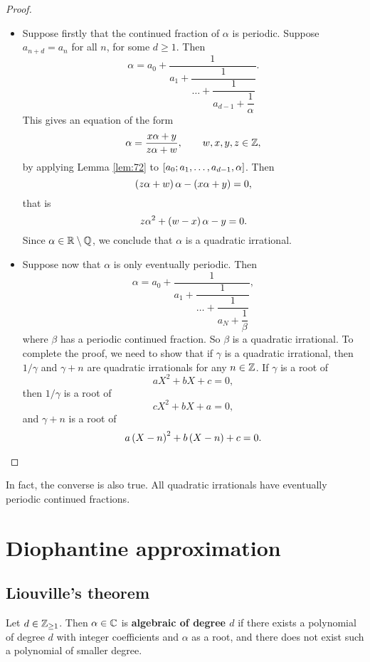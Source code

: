 \begin{proof}
\hfill
\begin{itemize}
\item Suppose firstly that the continued fraction of $ \alpha $ is periodic. Suppose $ a_{n + d} = a_n $ for all $ n $, for some $ d \ge 1 $. Then
$$ \alpha = a_0 + \dfrac{1}{a_1 + \dfrac{1}{\dots + \dfrac{1}{a_{d - 1} + \dfrac{1}{\alpha}}}}. $$
This gives an equation of the form
$$ \alpha = \dfrac{x\alpha + y}{z\alpha + w}, \qquad w, x, y, z \in \mathbb{Z}, $$
by applying Lemma \ref{lem:72} to $ \sbr{a_0; a_1, \dots, a_{d - 1}, \alpha} $. Then
$$ \br{z\alpha + w}\alpha - \br{x\alpha + y} = 0, $$
that is
$$ z\alpha^2 + \br{w - x}\alpha - y = 0. $$
Since $ \alpha \in \mathbb{R} \setminus \mathbb{Q} $, we conclude that $ \alpha $ is a quadratic irrational.
\item Suppose now that $ \alpha $ is only eventually periodic. Then
$$ \alpha = a_0 + \dfrac{1}{a_1 + \dfrac{1}{\dots + \dfrac{1}{a_N + \dfrac{1}{\beta}}}}, $$
where $ \beta $ has a periodic continued fraction. So $ \beta $ is a quadratic irrational. To complete the proof, we need to show that if $ \gamma $ is a quadratic irrational, then $ 1 / \gamma $ and $ \gamma + n $ are quadratic irrationals for any $ n \in \mathbb{Z} $. If $ \gamma $ is a root of
$$ aX^2 + bX + c = 0, $$
then $ 1 / \gamma $ is a root of
$$ cX^2 + bX + a = 0, $$
and $ \gamma + n $ is a root of
$$ a\br{X - n}^2 + b\br{X - n} + c = 0. $$
\end{itemize}
\end{proof}

In fact, the converse is also true. All quadratic irrationals have eventually periodic continued fractions.

\pagebreak

\section{Diophantine approximation}

\subsection{Liouville's theorem}

\begin{definition}
Let $ d \in \mathbb{Z}_{\ge 1} $. Then $ \alpha \in \mathbb{C} $ is \textbf{algebraic of degree $ d $} if there exists a polynomial of degree $ d $ with integer coefficients and $ \alpha $ as a root, and there does not exist such a polynomial of smaller degree.
\end{definition}

